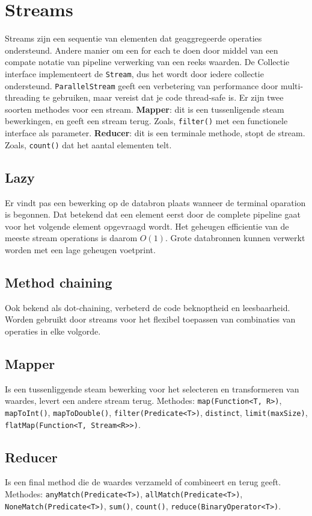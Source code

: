 \section{Streams}
Streams zijn een sequentie van elementen dat geaggregeerde operaties ondersteund.
Andere manier om een for each te doen door middel van een compate notatie van pipeline verwerking van een reeks waarden.
De Collectie interface implementeert de \texttt{Stream}, dus het wordt door iedere collectie ondersteund.
\texttt{ParallelStream} geeft een verbetering van performance door multi-threading te gebruiken, maar vereist dat je code thread-safe is.
Er zijn twee soorten methodes voor een stream.
\textbf{Mapper}: dit is een tussenligende steam bewerkingen, en geeft een stream terug.
Zoals, \texttt{filter()} met een functionele interface als parameter.
\textbf{Reducer}: dit is een terminale methode, stopt de stream.
Zoals, \texttt{count()} dat het aantal elementen telt.

\subsection{Lazy}
Er vindt pas een bewerking op de databron plaats wanneer de terminal oparation is begonnen.
Dat betekend dat een element eerst door de complete pipeline gaat voor het volgende element opgevraagd wordt.
Het geheugen efficientie van de meeste stream operations is daarom $O(1)$.
Grote databronnen kunnen verwerkt worden met een lage geheugen voetprint.

\subsection{Method chaining}
Ook bekend als dot-chaining, verbeterd de code beknoptheid en leesbaarheid.
Worden gebruikt door streams voor het flexibel toepassen van combinaties van operaties in elke volgorde.

\subsection{Mapper}
Is een tussenliggende steam bewerking voor het selecteren en transformeren van waardes, levert een andere stream terug.
Methodes: \texttt{map(Function<T, R>)}, \texttt{mapToInt()}, \texttt{mapToDouble()}, \texttt{filter(Predicate<T>)}, \texttt{distinct}, \texttt{limit(maxSize)}, \texttt{flatMap(Function<T, Stream<R>>)}.

\subsection{Reducer}
Is een final method die de waardes verzameld of combineert en terug geeft.
Methodes: \texttt{anyMatch(Predicate<T>)}, \texttt{allMatch(Predicate<T>)}, \texttt{NoneMatch(Predicate<T>)}, \texttt{sum()}, \texttt{count()}, \texttt{reduce(BinaryOperator<T>)}.

